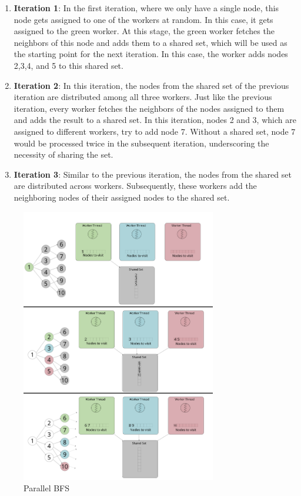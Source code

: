 \begin{enumerate}
    \item \textbf{Iteration 1}: In the first iteration, where we only have a
        single node, this node gets assigned to one of the workers at
        random. In this case, it gets assigned to the green worker. At this
        stage, the green worker fetches the neighbors of this node and adds
        them to a shared set, which will be used as the starting point for the
        next iteration. In this case, the worker adds nodes 2,3,4, and 5 to this
        shared set.
    \item \textbf{Iteration 2}: In this iteration, the nodes from the shared set
        of the previous iteration are distributed among all three workers. Just
        like the previous iteration, every worker fetches the neighbors of the
        nodes assigned to them and adds the result to a shared set. In this
        iteration, nodes 2 and 3, which are assigned to different workers, try
        to add node 7. Without a shared set, node 7 would be processed twice in 
        the subsequent iteration, underscoring the necessity of sharing the set.
    \item \textbf{Iteration 3}: Similar to the previous iteration, the nodes from
        the shared set are distributed across workers. Subsequently, these
        workers add the neighboring nodes of their assigned nodes to the shared
        set.
\end{enumerate}
\begin{figure}[ht]
    \centering
    \includegraphics[width=0.76\textwidth]{figures/parallelBFS.png}
    \caption{Parallel BFS}
    \label{fig:parallelBFS}
\end{figure}

